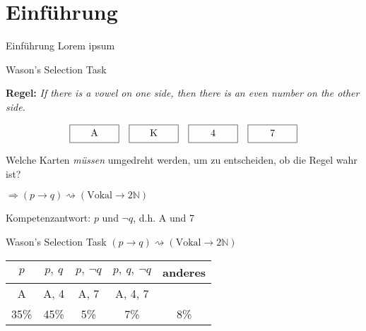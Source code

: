 
{
    \section{Einführung}
}

\begin{frame}{Einführung}
    Lorem ipsum
\end{frame}

\begin{frame}{Wason's Selection Task {\scriptsize \cite[S.~44-46]{stenningHumanReasoningCognitive2008}}}

    \textbf{Regel:} \emph{If there is a vowel on one side, then there is an even number on the other side.}

    \[
        \framebox[5em][c]{A\strut}\quad
        \framebox[5em][c]{K\strut}\quad
        \framebox[5em][c]{4\strut}\quad
        \framebox[5em][c]{7\strut}
    \]

    Welche Karten \emph{müssen} umgedreht werden, um zu entscheiden, ob die Regel wahr ist?

    $\Rightarrow (p \to q) \rightsquigarrow (\text{Vokal} \to 2\mathbb{N})$

    Kompetenzantwort: $p$ und $\lnot q$, d.h. A und 7
\end{frame}

\begin{frame}{Wason's Selection Task {\scriptsize \cite[S.~44-46]{stenningHumanReasoningCognitive2008}}}
    $(p \to q) \rightsquigarrow (\text{Vokal} \to 2\mathbb{N})$

    \begin{center}
        \begin{tabular}{c | c | c | c | c}
            $p$ &$p,~q$ &\alert{$p, ~\lnot q$} &$p, ~q, ~\lnot q$ &anderes \\
            \hline
            A &A, 4 &\alert{A, 7} &A, 4, 7 & \\
            \hline \hline
            35\% &45\% &\alert{5\%} &7\% &8\%
        \end{tabular}
    \end{center}
\end{frame}
